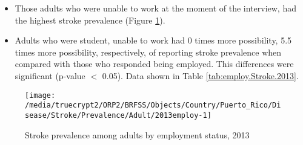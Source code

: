 
 \newpage
\begin{itemize}


\item Those adults who were 
unable to work at the moment of the interview, had the highest stroke prevalence (Figure \ref{fig:employ.Stroke.2013}).

\item Adults who were student, unable to work had 0 times more possibility, 5.5 times more possibility, respectively, of reporting stroke prevalence when compared with those who responded being employed. This differences were significant (p-value $<$ 0.05). 
Data shown in Table \ref{tab:employ.Stroke.2013}.


\end{itemize}

\begin{figure}[H]
\caption{Stroke prevalence among adults by employment status, 
         2013}
\label{fig:employ.Stroke.2013}
\begin{knitrout}
\color{fgcolor}

{\centering \texttt{[image: /media/truecrypt2/ORP2/BRFSS/Objects/Country/Puerto\_Rico/Disease/Stroke/Prevalence/Adult/2013employ-1]} 

}



\end{knitrout}
 \end{figure}

